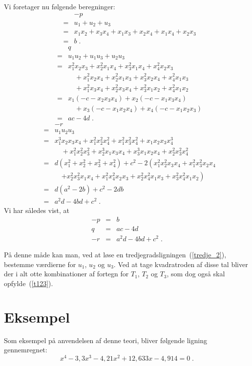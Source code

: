 \documentclass[12pt,oneside,a4paper]{article}
\newcommand{\bas}{\begin{eqnarray*}}
\newcommand{\eas}{\end{eqnarray*}}
\newcommand{\bea}{\begin{eqnarray}}
\newcommand{\eea}{\end{eqnarray}}
\begin{document}
Vi foretager nu følgende beregninger:
\bas
&& -p \\
&=& u_1+u_2+u_3 \\
&=& x_1x_2+x_3x_4 + x_1x_3+x_2x_4 + x_1x_4+x_2x_3 \\
&=& b\;.
\eas
\bas
&& q \\
&=& u_1u_2 + u_1u_3 + u_2u_3 \\
&=& x_1^2x_2x_3 + x_2^2x_1x_4 + x_3^2x_1x_4 + x_4^2x_2x_3 \\
&& \quad +x_1^2x_2x_4 + x_2^2x_1x_3 + x_3^2x_2x_4 + x_4^2x_1x_3 \\
&& \quad +x_1^2x_3x_4 + x_2^2x_3x_4 + x_3^2x_1x_2 + x_4^2x_1x_2 \\
&=& x_1(-c-x_2x_3x_4) + x_2(-c-x_1x_3x_4) \\
&& \quad + x_3(-c-x_1x_2x_4) + x_4(-c-x_1x_2x_3) \\
&=& ac-4d \;.
\eas
\bas
&& -r \\
&=& u_1u_2u_3 \\
&=& x_1^3x_2x_3x_4 + x_1^2x_2^2x_4^2 + x_1^2x_3^2x_4^2 + x_1x_2x_3x_4^3 \\
&& \quad + x_1^2x_2^2x_3^2 + x_2^3x_1x_3x_4 + x_3^3x_1x_2x_4 + x_2^2x_3^2x_4^2 \\
&=& d(x_1^2+x_2^2+x_3^2+x_4^2) + c^2 - 2\left(x_1^2x_2^2x_3x_4 + x_1^2x_3^2x_2x_4 \right.\\
&& \quad \left. + x_2^2x_3^2x_1x_4 + x_1^2x_4^2x_2x_3 + x_2^2x_4^2x_1x_3 + x_3^2x_4^2x_1x_2\right) \\
&=& d(a^2-2b) + c^2 - 2db \\
&=& a^2d - 4bd + c^2 \;.
\eas
Vi har således vist, at
\bea
-p &=& b \label{eq_p}\\
 q &=& ac-4d \label{eq_q}\\
-r &=& a^2d-4bd+c^2 \label{eq_r}\;.
\eea

På denne måde kan man, ved at løse en tredjegradsligningen~(\ref{tredje_2}),
bestemme værdierne for $u_1$, $u_2$ og $u_3$. Ved at tage kvadratroden af disse
tal bliver der i alt otte kombinationer af fortegn for $T_1$, $T_2$ og $T_3$,
som dog også skal opfylde~(\ref{t123}).


\section{Eksempel}
Som eksempel på anvendelsen af denne teori, bliver følgende
ligning gennemregnet:
\begin{equation}
    x^4 - 3,3 x^3 - 4,21 x^2 + 12,633 x - 4,914 = 0 \;.
\end{equation}
\end{document}
